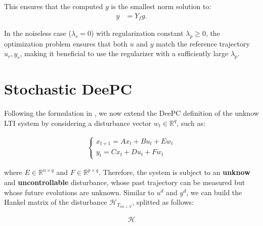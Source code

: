 \documentclass[12pt, a4paper]{article}
\begin{document}
This ensures that the computed \( g \) is the smallest norm solution to:
\begin{align}
    y &= Y_f g.
\end{align}

In the noiseless case (\( \lambda_s = 0 \)) with regularization constant \( \lambda_p \geq 0 \), the optimization problem ensures that both \( u \) and \( y \) match the reference trajectory \( u_r, y_r \), making it beneficial to use the regularizer with a sufficiently large \( \lambda_p \).

\section{Stochastic DeePC}
Following the formulation in \cite{huang2021decentralized}, we now extend the DeePC definition of the unknow LTI system by considering a disturbance vector $w_t \in \mathbb{R}^q$, such as: 

\begin{align}
    \begin{cases}
    x_{t+1} = Ax_t + Bu_t + Ew_t \\
    y_t = Cx_t + Du_t + Fw_t
    \end{cases}
\end{align}

where $E \in \mathbb{R}^{n \times q}$ and $F \in \mathbb{R}^{p \times q}$.
Therefore, the system is subject to an \textbf{unknow} and \textbf{uncontrollable} disturbance, whose past trajectory can be measured but whose future evolutions are unknown. Similar to $u^d$ and $y^d$, we can build the Hankel matrix of the disturbance $\mathcal{H}_{T_{ini + N}}$, splitted as follows: 

\begin{align}
    \mathcal{H} 
\end{align}



 

\end{document}
